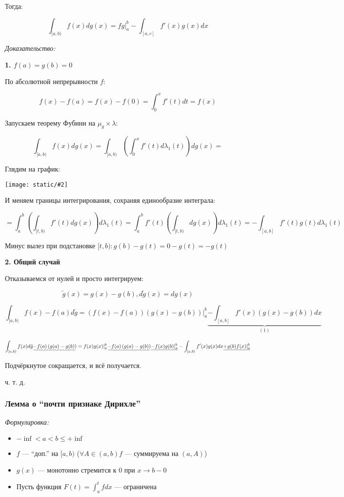 \documentclass{article}
\def\images#1#2{\begin{center}\texttt{[image: static/\#2]}\end{center}}
\begin{document}
Тогда:

\[\int_{[a, b)} f(x) dg(x) = fg|_{a}^{b} - \int_{[a, c]} f'(x)g(x)dx\]

\textit{Доказательство:}

\textbf{1. $f(a) = g(b) = 0$}

По абсолютной непрерывности $f$: 

\[f(x) - f(a) = f(x) - f(0) = \int_0^x f'(t)dt = f(x)\]

Запускаем теорему Фубини на $\mu_g \times \lambda$:

\[\int_{[a, b)} f(x) dg(x) = \int_{[a, b)} \left( \int_0^x f'(t) d \lambda_1(t)\right) dg(x) = \]

Глядим на график:

\images{0.5}{po_chast.jpg}

И меняем границы интегрирования, сохраняя единообразие интеграла:

\[ = \int_a^b \left( \int_{[t, b)} f'(t) dg(x)\right) d\lambda_1(t) = \int_a^b f'(t) \left( \int_{[t, b)} dg(x)\right) d \lambda_1(t) = - \int_{[a, b]} f'(t) g(t) d\lambda_1(t)\]

Минус вылез при подстановке $[t, b): g(b) - g(t) = 0 - g(t) = -g(t)$

\textbf{2. Общий случай}

Отказываемся от нулей и просто интегрируем:

\[\tilde{g}(x) = g(x) - g(b), d\tilde{g}(x) = dg(x)\]

\[\int_{[a, b)} f(x) - f(a) d\tilde{g} = \left(f(x) - f(a)\right)\left(g(x) - g(b)\right)|_a^b \underbrace{-\int_{[a, b]} f'(x) \left(g(x) - g(b)\right) dx}_{(1)} \]

\[\int_{[a, b)} f(x) d\tilde{g} \uwave{- f(a)\left(g(a) - g(b)\right)} = f(x)g(x)|_a^b \uwave{- f(a)\left(g(a) - g(b)\right)} \underline{- f(x)g(b)|_a^b} - \int_{[a, b)} f'(x)g(x)dx \underline{ +g(b) f(x)|_a^b} \]

Подчёркнутое сокращается, и всё получается.

ч. т. д. 

\subsubsection{Лемма о  ``почти признаке Дирихле''}
\textit{Формулировка:}

\begin{itemize}
    \item $-\inf < a < b \le +\inf$
    \item $f$ --- ``доп.'' на $[a, b)$ ($\forall A \in (a, b) f$ --- суммируема на $(a, A)$)
    \item $g(x)$ --- монотонно стремится к 0 при $x \rightarrow b - 0$
    \item Пусть функция $F(t) = \int_{a}^{t} fdx$ --- ограничена
\end{itemize}
\end{document}
